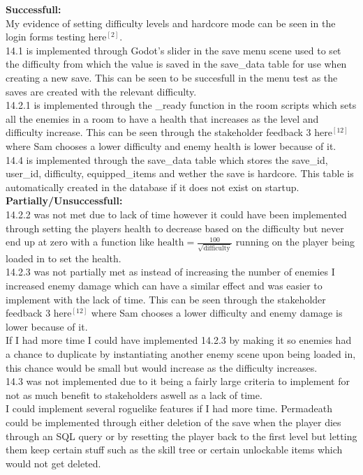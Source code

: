 \documentclass{article}
\begin{document}
        \textbf{Successfull:}\\
        My evidence of setting difficulty levels and hardcore mode can be seen in the login forms testing here$^{[2]}$.\\
        14.1 is implemented through Godot's slider in the save menu scene used to set the difficulty from which the value is saved in the save\_data table for use when creating a new save. This can be seen to be succesfull in the menu test as the saves are created with the relevant difficulty.\\
        14.2.1 is implemented through the \_ready function in the room scripts which sets all the enemies in a room to have a health that increases as the level and difficulty increase. This can be seen through the stakeholder feedback 3 here$^{[12]}$ where Sam chooses a lower difficulty and enemy health is lower because of it.\\
        14.4 is implemented through the save\_data table which stores the save\_id, user\_id, difficulty, equipped\_items and wether the save is hardcore. This table is automatically created in the database if it does not exist on startup.\\
        \textbf{Partially/Unsuccessfull:}\\
        14.2.2 was not met due to lack of time however it could have been implemented through setting the players health to decrease based on the difficulty but never end up at zero with a function like $\text{health} = \frac{100}{\sqrt{\text{difficulty}}}$ running on the player being loaded in to set the health.\\
        14.2.3 was not partially met as instead of increasing the number of enemies I increased enemy damage which can have a similar effect and was easier to implement with the lack of time. This can be seen through the stakeholder feedback 3 here$^{[12]}$ where Sam chooses a lower difficulty and enemy damage is lower because of it.\\
        If I had more time I could have implemented 14.2.3 by making it so enemies had a chance to duplicate by instantiating another enemy scene upon being loaded in, this chance would be small but would increase as the difficulty increases.\\
        14.3 was not implemented due to it being a fairly large criteria to implement for not as much benefit to stakeholders aswell as a lack of time.\\
        I could implement several roguelike features if I had more time. Permadeath could be implemented through either deletion of the save when the player dies through an SQL query or by resetting the player back to the first level but letting them keep certain stuff such as the skill tree or certain unlockable items which would not get deleted.\\
\end{document}
